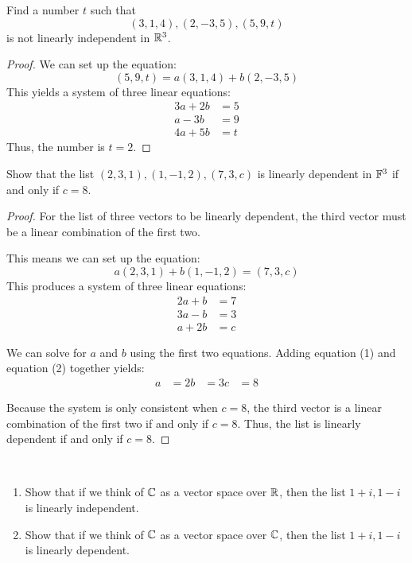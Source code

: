 \begin{question}
	Find a number $t$ such that
	\[
	(3, 1, 4), (2, -3, 5), (5, 9, t)
	\]
	is not linearly independent in $\mathbb{R}^3$.
\end{question}
\begin{proof}
	We can set up the equation:
	\[
	(5, 9, t) = a(3, 1, 4) + b(2, -3, 5)
	\]
	This yields a system of three linear equations:
	\begin{align}
		3a + 2b &= 5 \\
		a - 3b &= 9 \\
		4a + 5b &= t
	\end{align}
	Thus, the number is $t = 2$.
\end{proof}
\begin{question}
	Show that the list $(2, 3, 1), (1, -1, 2), (7, 3, c)$ is linearly dependent in $\mathbb{F}^3$ if and only if $c = 8$.
\end{question}
\begin{proof}
	For the list of three vectors to be linearly dependent, the third vector must be a linear combination of the first two. 
	
	This means we can set up the equation:
	\[
	a(2, 3, 1) + b(1, -1, 2) = (7, 3, c)
	\]
	This produces a system of three linear equations:
	\begin{align}
		2a + b &= 7 \\
		3a - b &= 3 \\
		a + 2b &= c
	\end{align}
	
	We can solve for $a$ and $b$ using the first two equations. Adding equation (1) and equation (2) together yields:
	\begin{align*}
		a &= 2
		b &= 3
		c &= 8
	\end{align*}
	
	Because the system is only consistent when $c = 8$, the third vector is a linear combination of the first two if and only if $c = 8$. Thus, the list is linearly dependent if and only if $c = 8$.
\end{proof}
\begin{question} \mbox{}\\
	\begin{enumerate} 
		\item[(a)] Show that if we think of $\mathbb{C}$ as a vector space over $\mathbb{R}$, then the list $1 + i, 1 - i$ is linearly independent.
		\item[(b)] Show that if we think of $\mathbb{C}$ as a vector space over $\mathbb{C}$, then the list $1 + i, 1 - i$ is linearly dependent.
	\end{enumerate}
\end{question}
